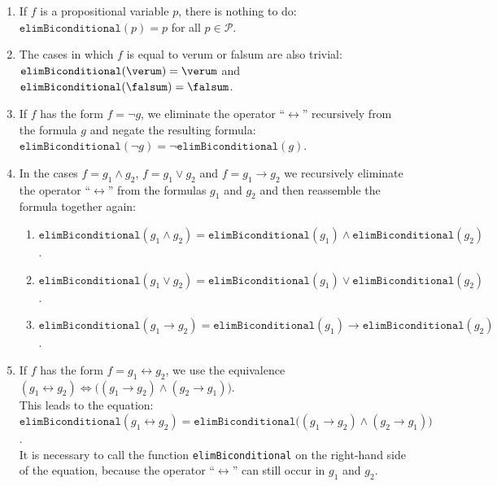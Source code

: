 \begin{enumerate}
\item If $f$ is a propositional variable $p$, there is nothing to do:
      \\[0.2cm]
      \hspace*{1.3cm}
      $\texttt{elimBiconditional}(p) = p$ \quad for all $p \in \mathcal{P}$.
\item The cases in which $f$ is equal to verum or  falsum are also trivial:
      \\[0.2cm]
      \hspace*{1.3cm}
      $\texttt{elimBiconditional}(\verum) = \verum$ \quad and \quad
      $\texttt{elimBiconditional}(\falsum) = \falsum$.
\item If $f$ has the form $f = \neg g$, we eliminate the operator
      ``$\leftrightarrow$'' recursively from the formula $g$ and negate the resulting formula: \\[0.2cm]
      \hspace*{1.3cm} 
      $\texttt{elimBiconditional}(\neg g) = \neg \texttt{elimBiconditional}(g)$.
\item In the cases $f = g_1 \wedge g_2$, $f = g_1 \vee g_2$ and $f = g_1 \rightarrow g_2$ we 
      recursively eliminate the operator ``$\leftrightarrow$'' from the formulas $g_1$ and $g_2$ and then reassemble the formula
      together again: 
      \begin{enumerate}
      \item $\texttt{elimBiconditional}(g_1 \wedge g_2) = \texttt{elimBiconditional}(g_1) \wedge \texttt{elimBiconditional}(g_2)$.
      \item $\texttt{elimBiconditional}(g_1 \vee g_2) = \texttt{elimBiconditional}(g_1) \vee \texttt{elimBiconditional}(g_2)$.
      \item $\texttt{elimBiconditional}(g_1 \rightarrow g_2) = \texttt{elimBiconditional}(g_1) \rightarrow \texttt{elimBiconditional}(g_2)$.
      \end{enumerate}
\item If $f$ has the form $f = g_1 \leftrightarrow g_2$, we use the
      equivalence \\[0.2cm]
      \hspace*{1.3cm} 
      $(g_1 \leftrightarrow g_2) \Leftrightarrow \bigl( (g_1 \rightarrow g_2) \wedge (g_2 \rightarrow g_1)\bigr) $.
      \\[0.2cm]
      This leads to the equation:
      \\[0.2cm]
      \hspace*{1.3cm} 
      $\texttt{elimBiconditional}(g_1 \leftrightarrow g_2) = \texttt{elimBiconditional}\bigl( (g_1 \rightarrow g_2) \wedge (g_2 \rightarrow g_1)\bigr)$. 
      \\[0.2cm]
      It is necessary to call the function \texttt{elimBiconditional} on the right-hand side of the equation,
      because the operator ``$\leftrightarrow$'' can still occur in $g_1$ and $g_2$.
\end{enumerate}


